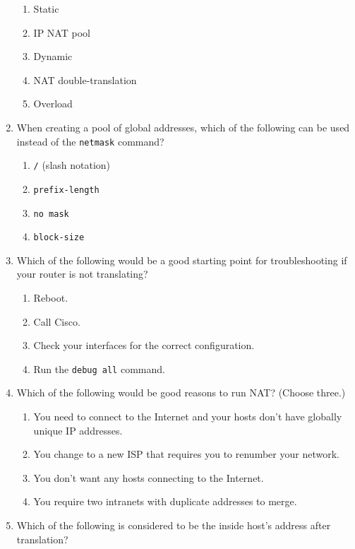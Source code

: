 \documentclass[b5paper,11pt]{memoir}
\begin{document}
\begin{enumerate}
  \begin{enumerate}
  \tightlist
  \item
    Static
  \item
    IP NAT pool
  \item
    Dynamic
  \item
    NAT double-translation
  \item
    Overload
  \end{enumerate}
\item
  When creating a pool of global addresses, which of the following can
  be used instead of the \texttt{netmask} command?

  \begin{enumerate}
  \tightlist
  \item
    \texttt{/} (slash notation)
  \item
    \texttt{prefix-length}
  \item
    \texttt{no\ mask}
  \item
    \texttt{block-size}
  \end{enumerate}
\item
  Which of the following would be a good starting point for
  troubleshooting if your router is not translating?

  \begin{enumerate}
  \tightlist
  \item
    Reboot.
  \item
    Call Cisco.
  \item
    Check your interfaces for the correct configuration.
  \item
    Run the \texttt{debug\ all} command.
  \end{enumerate}
\item
  Which of the following would be good reasons to run NAT? (Choose
  three.)

  \begin{enumerate}
  \tightlist
  \item
    You need to connect to the Internet and your hosts don't have
    globally unique IP addresses.
  \item
    You change to a new ISP that requires you to renumber your network.
  \item
    You don't want any hosts connecting to the Internet.
  \item
    You require two intranets with duplicate addresses to merge.
  \end{enumerate}
\item
  Which of the
  following is considered to be the inside host's address after
  translation?


\end{enumerate}
\end{document}
